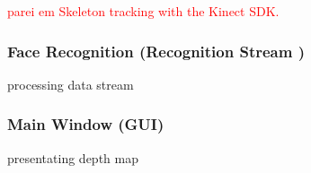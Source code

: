 \textcolor{red}{parei em Skeleton tracking with the Kinect SDK. %
}


\subsubsection{Face Recognition (Recognition Stream )}\label{sec:depthDataRecognition}
processing data stream


\subsubsection{Main Window (GUI)}\label{sec:mainWindow}
presentating depth map